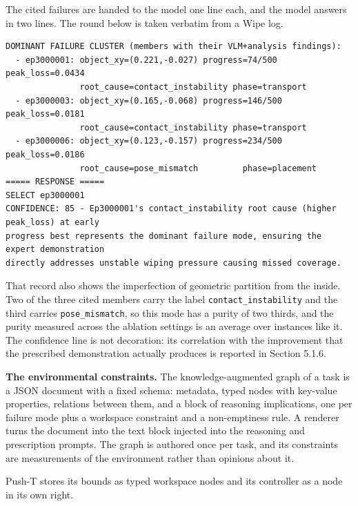 \documentclass[
  11pt,
]{article}
\begin{document}
The cited failures are handed to the model one line each, and the model
answers in two lines. The round below is taken verbatim from a Wipe log.

\begin{verbatim}
DOMINANT FAILURE CLUSTER (members with their VLM+analysis findings):
  - ep3000001: object_xy=(0.221,-0.027) progress=74/500  peak_loss=0.0434
               root_cause=contact_instability phase=transport
  - ep3000003: object_xy=(0.165,-0.068) progress=146/500 peak_loss=0.0181
               root_cause=contact_instability phase=transport
  - ep3000006: object_xy=(0.123,-0.157) progress=234/500 peak_loss=0.0186
               root_cause=pose_mismatch         phase=placement
===== RESPONSE =====
SELECT ep3000001
CONFIDENCE: 85 - Ep3000001's contact_instability root cause (higher peak_loss) at early
progress best represents the dominant failure mode, ensuring the expert demonstration
directly addresses unstable wiping pressure causing missed coverage.
\end{verbatim}

That record also shows the imperfection of geometric partition from the
inside. Two of the three cited members carry the label
\texttt{contact\_instability} and the third carries
\texttt{pose\_mismatch}, so this mode has a purity of two thirds, and
the purity measured across the ablation settings is an average over
instances like it. The confidence line is not decoration: its
correlation with the improvement that the prescribed demonstration
actually produces is reported in Section 5.1.6.

\textbf{The environmental constraints.} The knowledge-augmented graph of
a task is a JSON document with a fixed schema: metadata, typed nodes
with key-value properties, relations between them, and a block of
reasoning implications, one per failure mode plus a workspace constraint
and a non-emptiness rule. A renderer turns the document into the text
block injected into the reasoning and prescription prompts. The graph is
authored once per task, and its constraints are measurements of the
environment rather than opinions about it.

Push-T stores its bounds as typed workspace nodes and its controller as
a node in its own right.
\end{document}

